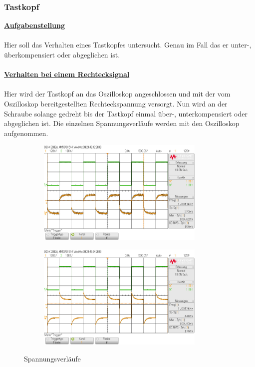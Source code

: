 \documentclass[a4paper,12pt]{article}
\begin{document}
	\subsubsection{Tastkopf}
	\underline{\textbf{Aufgabenstellung}}\\ \\
	Hier soll das Verhalten eines Tastkopfes untersucht. Genau im Fall das er unter-, überkompensiert oder abgeglichen ist. \\ \\
	\underline{\textbf{Verhalten bei einem Rechtecksignal}} \\ \\
	Hier wird der Tastkopf an das Oszilloskop angeschlossen und mit der vom Oszilloskop bereitgestellten Rechteckspannung versorgt. Nun wird an der Schraube solange gedreht bis der Tastkopf einmal über-, unterkompensiert oder abgeglichen ist. Die einzelnen Spannungsverläufe werden mit den Oszilloskop aufgenommen.
	\begin{figure}[h]
		\begin{subfigure}{7cm}
			\centering
			\includegraphics[width=8cm]{img/Unterkompensiert}
		\end{subfigure}
		\hspace{2.5cm}
		\begin{subfigure}{7cm}
			\includegraphics[width=8cm]{img/UeKomp}
		\end{subfigure}
		\caption{Spannungsverläufe}
	\end{figure}
\end{document}
